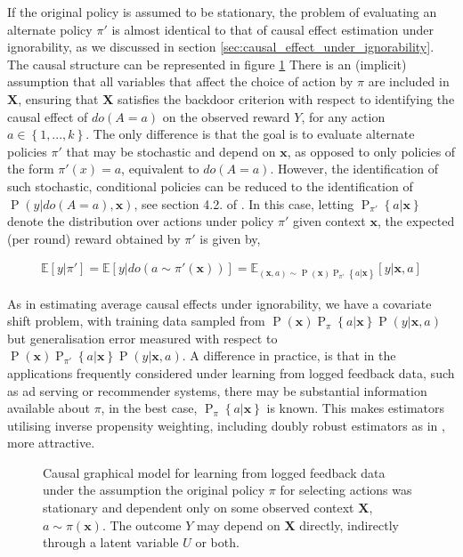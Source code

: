 \documentclass[11pt,a4paper,twoside]{report}
\newcommand{\Pns}[2]{\operatorname{P}_{#1}\left\{#2\right\}}
\newcommand{\Esub}[2]{\mathbb E_{#1}\left[{#2}\right]}
\newcommand{\E}[1]{\mathbb E\left[{#1}\right]}
\newcommand{\set}[1]{\left\{#1\right\}}
\newcommand{\eqn}[1]{\begin{align}#1\end{align}}
\renewcommand{\P}[1]{\operatorname{P}\left(#1\right)}
\renewcommand{\vec}[1]{\boldsymbol{#1}}
\theoremstyle{plain}
\theoremstyle{definition}
\begin{document}
If the original policy is assumed to be stationary, the problem of evaluating an alternate policy $\pi'$ is almost identical to that of causal effect estimation under ignorability, as we discussed in section \ref{sec:causal_effect_under_ignorability}. The causal structure can be represented in figure \ref{fig:off-policy-evaluation} There is an (implicit) assumption that all variables that affect the choice of action by $\pi$ are included in $\vec{X}$, ensuring that $\vec{X}$ satisfies the backdoor criterion with respect to identifying the causal effect of $do(A = a)$ on the observed reward $Y$, for any action $a \in \set{1,...,k}$. The only difference is that the goal is to evaluate alternate policies $\pi'$ that may be stochastic and depend on $\vec{x}$, as opposed to only policies of the form $\pi'(x) = a$, equivalent to $do(A=a)$. However, the identification of such stochastic, conditional policies can be reduced to the identification of $\P{y|do(A=a),\vec{x}}$, see section 4.2. of \citet{Pearl2000}. In this case, letting $\Pns{\pi'}{a|\vec{x}}$ denote the distribution over actions under policy $\pi'$ given context $\vec{x}$, the expected (per round) reward obtained by $\pi'$ is given by,

\eqn{
\E{y|\pi'} = \E{y|do(a \sim \pi'(\vec{x}))} = \Esub{(\vec{x},a) \sim \P{\vec{x}}\Pns{\pi'}{a|\vec{x}}}{y|\vec{x},a}
}

As in estimating average causal effects under ignorability, we have a covariate shift problem, with training data sampled from $\P{\vec{x}}\Pns{\pi}{a|\vec{x}}\P{y|\vec{x},a}$ but generalisation error measured with respect to $\P{\vec{x}}\Pns{\pi'}{a|\vec{x}}\P{y|\vec{x},a}$. A difference in practice, is that in the applications frequently considered under learning from logged feedback data, such as ad serving or recommender systems, there may be substantial information available about $\pi$, in the best case, $\Pns{\pi}{a|\vec{x}}$ is known. This makes estimators utilising inverse propensity weighting, including doubly robust estimators as in \citet{Dudik2011}, more attractive. 

\begin{figure}
\centering
{} 
\caption{Causal graphical model for learning from logged feedback data under the assumption the original policy $\pi$ for selecting actions was stationary and dependent only on some observed context $\vec{X}$, $a \sim \pi(\vec{x})$. The outcome $Y$ may depend on $\vec{X}$ directly, indirectly through a latent variable $U$ or both.}
\label{fig:off-policy-evaluation}
\end{figure}
\end{document}
